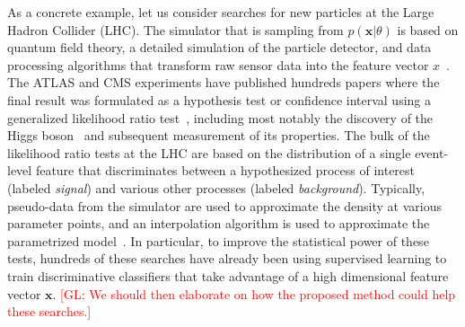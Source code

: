 \documentclass[12pt]{article}
\numberwithin{equation}{section}
\theoremstyle{plain}
\newcommand{\glnote}[1]{\textcolor{red}{[GL: #1]}}
\begin{document}
As a concrete example, let us consider searches for new particles at the Large
Hadron Collider (LHC). The simulator that is sampling from $p(\mathbf{x}|\theta)$ is
based on quantum field theory, a detailed simulation of the particle detector,
and data processing algorithms that transform raw sensor data into the feature
vector $x$~\citep{Sjostrand:2006za,Agostinelli:2002hh}. The ATLAS and CMS
experiments have published  hundreds papers where the final result was
formulated as a hypothesis test or confidence interval using a generalized
likelihood ratio test~\citep{Cowan:2010js}, including most notably the discovery
of the Higgs boson~\citep{Aad:2012tfa,Chatrchyan:2012ufa} and subsequent
measurement of its properties. The bulk of the likelihood ratio tests at the LHC
are based on the distribution of a single event-level feature that discriminates
between a hypothesized process of interest (labeled \textit{signal}) and various
other processes (labeled \textit{background}). Typically, pseudo-data from the
simulator are used to approximate the density at various parameter points, and
an interpolation algorithm is used to approximate the parametrized
model~\citep{Cranmer:2012sba}. In particular, to improve the statistical power
of these tests, hundreds of these searches have already been using supervised
learning to train discriminative classifiers that take advantage of a high
dimensional feature vector $\mathbf{x}$. \glnote{We should then elaborate on how the
proposed method could help these searches.}
\end{document}
